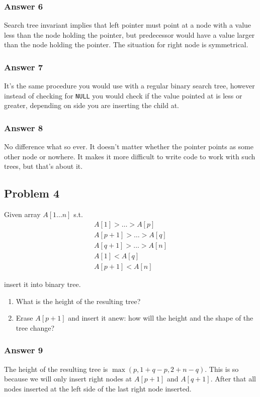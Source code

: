 \documentclass[11pt]{article}
\begin{document}
\subsubsection{Answer 6}
\label{sec-1-3-1}
Search tree invariant implies that left pointer must point at a node with
a value less than the node holding the pointer, but predecessor would have
a value larger than the node holding the pointer.  The situation for right
node is symmetrical.

\subsubsection{Answer 7}
\label{sec-1-3-2}
It's the same procedure you would use with a regular binary search tree,
however instead of checking for \texttt{NULL} you would check if the value pointed
at is less or greater, depending on side you are inserting the child at.

\subsubsection{Answer 8}
\label{sec-1-3-3}
No difference what so ever.  It doesn't matter whether the pointer points
as some other node or nowhere.  It makes it more difficult to write code
to work with such trees, but that's about it.

\subsection{Problem 4}
\label{sec-1-4}
Given array $A[1\dots n]$ s.t. 
\begin{align*}
  A[1] > \dots > A[p] \\
  A[p + 1] > \dots > A[q] \\
  A[q + 1] > \dots > A[n] \\
  A[1] < A[q] \\
  A[p + 1] < A[n]
\end{align*}

insert it into binary tree.
\begin{enumerate}
\item What is the height of the resulting tree?
\item Erase $A[p+1]$ and insert it anew: how will the height and the shape of
the tree change?
\end{enumerate}

\subsubsection{Answer 9}
\label{sec-1-4-1}
The height of the resulting tree is $\max(p, 1 + q - p, 2 + n - q)$.  This is
so because we will only insert right nodes at $A[p + 1]$ and $A[q + 1]$.  After
that all nodes inserted at the left side of the last right node inserted.
\end{document}
